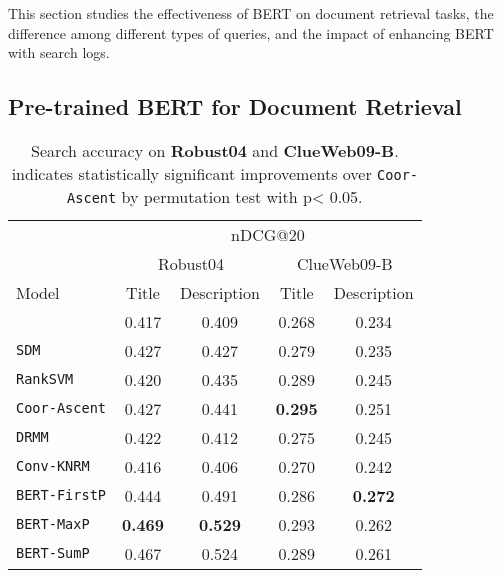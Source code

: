 \documentclass[sigconf]{acmart}
\begin{document}
This section studies the effectiveness of BERT on document retrieval tasks, the difference among different types of queries, and the impact of enhancing BERT with search logs.

\subsection{Pre-trained BERT for Document Retrieval}



\begin{table}[t]
\caption{Search accuracy on \textbf{Robust04} and \textbf{ClueWeb09-B}.  indicates statistically significant improvements over \texttt{Coor-Ascent} by permutation test with p< 0.05.}\label{tab:overall}

\def\arraystretch{0.9}
\vspace{-0.15in}
\begin{tabular}{l|cc||cc}
\hline \hline
  &  \multicolumn{4}{c}{nDCG@20}\\
\multirow{3}{*}{Model} & \multicolumn{2}{c||}{Robust04} & \multicolumn{2}{c}{ClueWeb09-B} \\
 & \multicolumn{1}{c}{Title  } & \multicolumn{1}{c||}{Description  } & \multicolumn{1}{c}{Title  } & \multicolumn{1}{c}{Description }  \\
                            \hline
\texttt{BOW}                         & 0.417    & 0.409   
 & 0.268  & 0.234  \\
\texttt{SDM}                         & 0.427           & 0.427         & 0.279 & 0.235  \\ \hline
\texttt{RankSVM}                    & 0.420         &   0.435        & 0.289  & 0.245  \\
\texttt{Coor-Ascent}                & 0.427            &     0.441               & \textbf{0.295}  & 0.251  \\ \hline
\texttt{DRMM}                       & 0.422          & 0.412            & 0.275  & 0.245  \\ 
\texttt{Conv-KNRM}                       &  0.416        &  0.406          & 0.270  &  0.242 \\ \hline\hline
\texttt{BERT-FirstP}           & 0.444            & 0.491             & 0.286  & \textbf{0.272}    \\
\texttt{BERT-MaxP}            & \textbf{0.469}           & \textbf{0.529}          & 0.293  & 0.262   \\ 
\texttt{BERT-SumP}        &  0.467     &   0.524    &   0.289 &   0.261      \\ 
\hline \hline 
 

\end{tabular}
\end{table}
\end{document}
